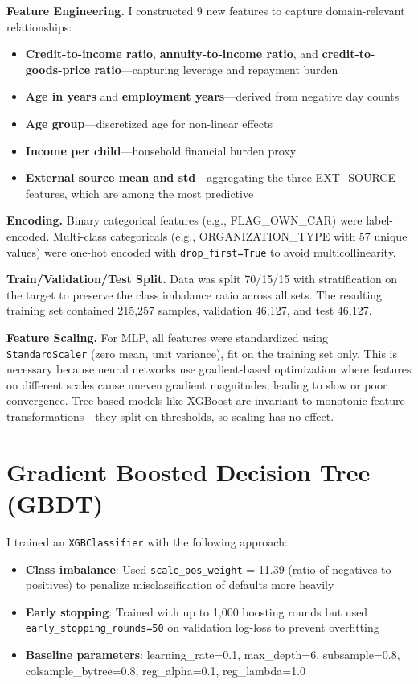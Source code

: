 \documentclass[11pt, letterpaper]{article}
\begin{document}
\textbf{Feature Engineering.} I constructed 9 new features to capture domain-relevant relationships:
\begin{itemize}[nosep]
    \item \textbf{Credit-to-income ratio}, \textbf{annuity-to-income ratio}, and \textbf{credit-to-goods-price ratio}---capturing leverage and repayment burden
    \item \textbf{Age in years} and \textbf{employment years}---derived from negative day counts
    \item \textbf{Age group}---discretized age for non-linear effects
    \item \textbf{Income per child}---household financial burden proxy
    \item \textbf{External source mean and std}---aggregating the three EXT\_SOURCE features, which are among the most predictive
\end{itemize}

\textbf{Encoding.} Binary categorical features (e.g., FLAG\_OWN\_CAR) were label-encoded. Multi-class categoricals (e.g., ORGANIZATION\_TYPE with 57 unique values) were one-hot encoded with \texttt{drop\_first=True} to avoid multicollinearity.

\textbf{Train/Validation/Test Split.} Data was split 70/15/15 with stratification on the target to preserve the class imbalance ratio across all sets. The resulting training set contained 215,257 samples, validation 46,127, and test 46,127.

\textbf{Feature Scaling.} For MLP, all features were standardized using \texttt{StandardScaler} (zero mean, unit variance), fit on the training set only. This is necessary because neural networks use gradient-based optimization where features on different scales cause uneven gradient magnitudes, leading to slow or poor convergence. Tree-based models like XGBoost are invariant to monotonic feature transformations---they split on thresholds, so scaling has no effect.

\section{Gradient Boosted Decision Tree (GBDT)}

I trained an \texttt{XGBClassifier} with the following approach:
\begin{itemize}[nosep]
    \item \textbf{Class imbalance}: Used \texttt{scale\_pos\_weight} = 11.39 (ratio of negatives to positives) to penalize misclassification of defaults more heavily
    \item \textbf{Early stopping}: Trained with up to 1,000 boosting rounds but used \texttt{early\_stopping\_rounds=50} on validation log-loss to prevent overfitting
    \item \textbf{Baseline parameters}: learning\_rate=0.1, max\_depth=6, subsample=0.8, colsample\_bytree=0.8, reg\_alpha=0.1, reg\_lambda=1.0
\end{itemize}
\end{document}
